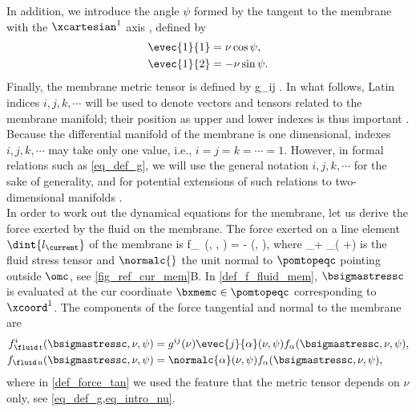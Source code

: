 In addition, we introduce the  angle $\psi$ formed by the tangent to the membrane with the $\xcartesian^1$ axis \cite{derenyiFormationInteractionMembrane2002}, defined by
\begin{align}
    \label{def_nu_psi_1}
    \evec{1}{1} & = \nu \cos \psi, \\
    \label{def_nu_psi_2}
    \evec{1}{2} & =-\nu \sin \psi.
\end{align}
Finally, the membrane metric tensor is defined by  \cite{marchiafavaAppuntiDiGeometria2005}
\be\label{eq_def_g}
g_{ij} \equiv {} \cdot {}.
\ee
In what follows, Latin indices $i, j, k, \cdots$ will be used to denote vectors and tensors related to the membrane manifold; their position as upper and lower indexes is thus important \cite{marchiafavaAppuntiDiGeometria2005}. Because the differential manifold of the membrane is one dimensional, indexes $i, j, k, \cdots$ may take only one value, i.e., $i=j=k= \cdots=1$. However, in formal relations such as \cref{eq_def_g}, we will use the general notation $i, j, k, \cdots$  for the sake of  generality, and for potential extensions of such relations to two-dimensional manifolds \cite{desernoFluidLipidMembranes2015}.
\vspace{0.5cm}\\


In order to work out the  dynamical equations for the membrane, let us derive the force exerted by the fluid on the membrane. The force exerted on a line element $\dint{l_\current}$ of the membrane  is \cite{landauFluidMechanics1987}
\be
\label{def_f_fluid_mem}
f_{\fluid\, \alpha}(\bsigmastressc, \nu, \psi) = - \sigmastressc{\alpha}{\beta} \normalc{\beta}(\nu, \psi),
\ee
where
\be
\label{eq_strees_tensor_fluid}
\sigmastressc{\alpha}{\beta} \equiv \sigmafc{} \delta_{\alpha \beta}+ \eta_\fluid\left( \pderc{ \vfc^\alpha}{\beta} +\pderc{ \vfc^\beta}{\alpha}\right)
\ee
is the fluid stress tensor \cite{landauFluidMechanics1987} and $\normalc{}$ the unit normal to $\pomtopeqc$ pointing outside $\omc$, see \cref{fig_ref_cur_mem}B.  In \cref{def_f_fluid_mem}, $\bsigmastressc$ is evaluated at the \ac{cur} coordinate $\bxmemc \in \pomtopeqc$ corresponding to $\xcoord^1$.
%
The components of the force  tangential and normal to the membrane are \cite{desernoFluidLipidMembranes2015}
\begin{align}
    \label{def_force_tan}
    f_{\fluid\, \text{t}}^i(\bsigmastressc, \nu, \psi) & = g^{ij}(\nu) \evec{j}{\alpha}(\nu,\psi) f_\alpha(\bsigmastressc, \nu, \psi), \\
    \label{def_force_norm}
    \fflun (\bsigmastressc, \nu, \psi)                 & = \normalc{\alpha}(\nu, \psi) f_\alpha(\bsigmastressc, \nu, \psi),
\end{align}
where in \cref{def_force_tan} we used the feature that the metric tensor depends on $\nu$ only, see \cref{eq_def_g,eq_intro_nu}.



